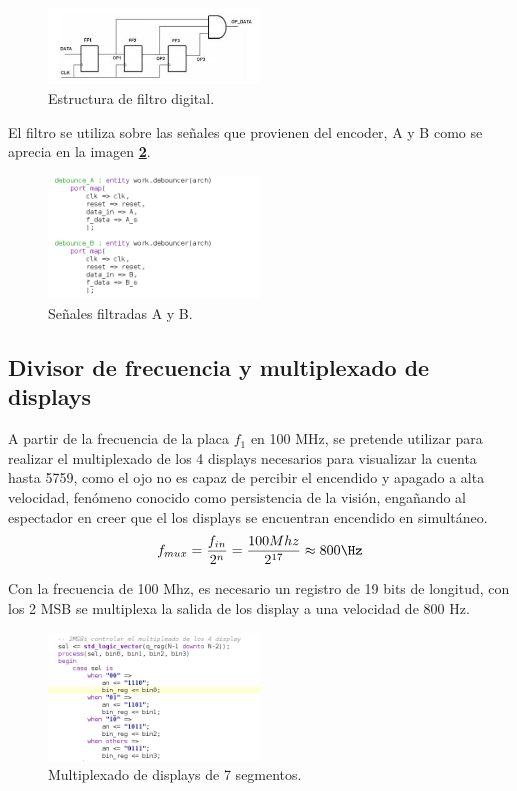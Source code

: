 \documentclass[11pt, a4paper]{article}
\begin{document}
	\begin{figure}[H]
		\centering
		\includegraphics[width=0.5\textwidth]{Imagenes/debouncer.png}
		\caption{Estructura de filtro digital.}
		\label{fig:debouncer}
	\end{figure} 

	El filtro se utiliza sobre las señales que provienen del encoder, A y B como se aprecia en la imagen \textcolor{blue}{\textbf{\ref{fig:A_B}}}.

	\begin{figure}[H]
		\centering
		\includegraphics[width=0.5\textwidth]{Imagenes/A_B.png}
		\caption{Señales filtradas A y B.}
		\label{fig:A_B}
	\end{figure} 


		\subsection{Divisor de frecuencia y multiplexado de displays}
			A partir de la frecuencia de la placa $f_1$ en 100 MHz, se pretende utilizar para realizar el multiplexado de los 4 displays necesarios para visualizar la cuenta hasta 5759, como el ojo no es capaz de percibir el encendido y apagado a alta velocidad, fenómeno conocido como persistencia de la visión, engañando al espectador en creer que el los displays se encuentran encendido en simultáneo.
		\begin{equation}
			f_{mux} = \frac{f_{in}}{2^n} = \frac{100Mhz}{2^{17}} \approx 800 \Hz
		\end{equation}

			Con la frecuencia de 100 Mhz, es necesario un registro de 19 bits de longitud, con los 2 MSB se multiplexa la salida de los display a una velocidad de 800 Hz.
		\begin{figure}[H]
			\centering
			\includegraphics[width=0.5\textwidth]{Imagenes/mux.png}
			\caption{Multiplexado de displays de 7 segmentos.}
			\label{fig:mux}
		\end{figure} 
		
\end{document}
